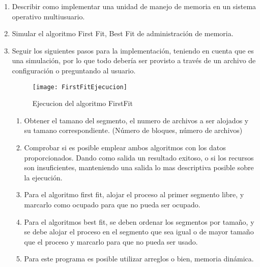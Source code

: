 \documentclass[a4paperx]{article}
\begin{document}
\begin{enumerate}


\item{Describir como implementar una unidad de manejo de memoria en un
sistema operativo multiusuario.}\\

\item{Simular el algoritmo First Fit, Best Fit de administraci\'on de memoria.}\\


\item{Seguir los siguientes pasos para la implementaci\'on, teniendo en cuenta
que es una simulaci\'on, por lo que todo deber\'ia ser provisto a trav\'es de un
archivo de configuraci\'on o preguntando al usuario.}\\

\begin{figure}[H]
\centering
\texttt{[image: FirstFitEjecucion]}
\caption{Ejecucion del algoritmo FirstFit}
\end{figure}

\begin{enumerate}

\item{Obtener el tamano del segmento, el numero de archivos a ser alojados y su tamano correspondiente. (N\'umero de bloques, n\'umero de
archivos)}\\

\item{Comprobar si es posible emplear ambos algoritmos con los datos
proporcionados. Dando como salida un resultado exitoso, o si los
recursos son insuficientes, manteniendo una salida lo mas descriptiva
posible sobre la ejecuci\'on.}\\

\item{Para el algoritmo first fit, alojar el proceso al primer segmento libre,
y marcarlo como ocupado para que no pueda ser ocupado.}\\

\item{Para el algoritmos best fit, se deben ordenar los segmentos por tama\~no, y se debe alojar el proceso en el segmento que sea igual o de mayor
tama\~no que el proceso y marcarlo para que no pueda ser usado.}\\

\item{Para este programa es posible utilizar arreglos o bien, memoria din\'amica.}\\


\end{enumerate}
\end{enumerate}
\end{document}
